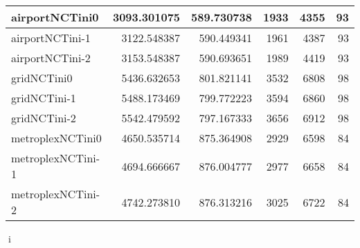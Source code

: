 \begin{longtable}{|l|r|r|r|r|r|}
airportNCTini0 & 3093.301075 & 589.730738 & 1933 & 4355 & 93 \\ \hline
airportNCTini-1 & 3122.548387 & 590.449341 & 1961 & 4387 & 93 \\ \hline
airportNCTini-2 & 3153.548387 & 590.693651 & 1989 & 4419 & 93 \\ \hline
gridNCTini0 & 5436.632653 & 801.821141 & 3532 & 6808 & 98 \\ \hline
gridNCTini-1 & 5488.173469 & 799.772223 & 3594 & 6860 & 98 \\ \hline
gridNCTini-2 & 5542.479592 & 797.167333 & 3656 & 6912 & 98 \\ \hline
metroplexNCTini0 & 4650.535714 & 875.364908 & 2929 & 6598 & 84 \\ \hline
metroplexNCTini-1 & 4694.666667 & 876.004777 & 2977 & 6658 & 84 \\ \hline
metroplexNCTini-2 & 4742.273810 & 876.313216 & 3025 & 6722 & 84 \\ \hline
\end{longtable}
i
